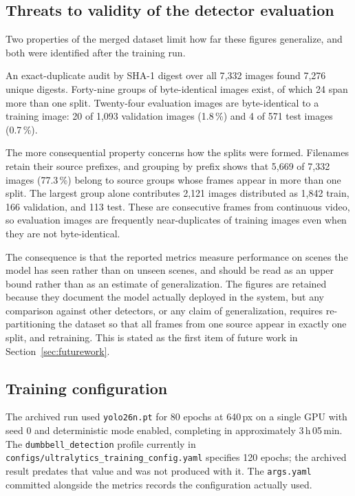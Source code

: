 \documentclass[11pt,a4paper]{article}
\newcommand{\code}[1]{\texttt{\small #1}}
\begin{document}
\subsection{Threats to validity of the detector evaluation}
\label{sec:leakage}

Two properties of the merged dataset limit how far these figures generalize, and
both were identified after the training run.

An exact-duplicate audit by SHA-1 digest over all 7{,}332 images found 7{,}276
unique digests. Forty-nine groups of byte-identical images exist, of which 24
span more than one split. Twenty-four evaluation images are byte-identical to a
training image: 20 of 1{,}093 validation images (1.8\,\%) and 4 of 571 test images
(0.7\,\%).

The more consequential property concerns how the splits were formed. Filenames
retain their source prefixes, and grouping by prefix shows that 5{,}669 of 7{,}332
images (77.3\,\%) belong to source groups whose frames appear in more than one
split. The largest group alone contributes 2{,}121 images distributed as
1{,}842 train, 166 validation, and 113 test. These are consecutive frames from
continuous video, so evaluation images are frequently near-duplicates of training
images even when they are not byte-identical.

The consequence is that the reported metrics measure performance on scenes the
model has seen rather than on unseen scenes, and should be read as an upper bound
rather than as an estimate of generalization. The figures are retained because
they document the model actually deployed in the system, but any comparison
against other detectors, or any claim of generalization, requires re-partitioning
the dataset so that all frames from one source appear in exactly one split, and
retraining. This is stated as the first item of future work in
Section~\ref{sec:futurework}.

\subsection{Training configuration}

The archived run used \code{yolo26n.pt} for 80 epochs at 640\,px on a single GPU
with seed 0 and deterministic mode enabled, completing in approximately
3\,h\,05\,min. The \code{dumbbell\_detection} profile currently in
\code{configs/ultralytics\_training\_config.yaml} specifies 120 epochs; the
archived result predates that value and was not produced with it. The
\code{args.yaml} committed alongside the metrics records the configuration
actually used.
\end{document}

